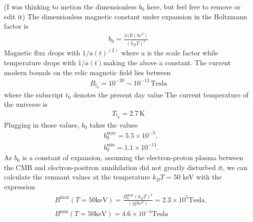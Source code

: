 \documentclass[Universe,article,submit,moreauthors,pdftex]{Definitions/mdpi}
\begin{document}
{\color{blue}(I was thinking to metion the dimensionless $b_0$ here, but feel free to remove or edit it)
The dimensionless magnetic constant under expansion in the Boltzmann factor is
\begin{align}
b_0= \frac{|e|B(\hbar c^2)}{(k_B T)^2}
\end{align}
Magnetic flux drops with $1/a(t)^(2)$ where $a$ is the scale factor while temperature drops with $1/a(t)$making the above a constant. The current modern bounds on the relic magnetic field lies between
\begin{align}
B_{t_0}=10^{-20}\sim10^{-12}\,\mathrm{Tesla}
\end{align}
where the subscript $t_0$ denotes the present day value The current temperature of the universe is 
\begin{align}
T_{t_0}=2.7\,\mathrm{K}
\end{align}
Plugging in those values, $b_0$ takes the values
\begin{align}
&b_0^{\mathrm{max}}= 5.5\times10^{-3},\\
&b_0 ^{\mathrm{min}}= 1.1\times10^{-11}.
\end{align}
As $b_0$ is a constant of expansion, assuming the electron-proton plasma between the CMB and electron-positron annihilation did not greatly disturbed it, we can calculate the remnant values at the temperature $k_BT=50$ keV with the expression
\begin{align}
&B^{\mathrm{max}}(T=50 \mathrm{keV}) = \frac{B^{\mathrm{max}}_0(k_B T)^2}{(|q|\hbar c^2)}= 2.3\times10^5 \mathrm{Tesla},\\
&B^{\mathrm{min}}(T=50 \mathrm{keV})= 4.6\times10^{-4} \mathrm{Tesla}
\end{align}
}
\end{document}
